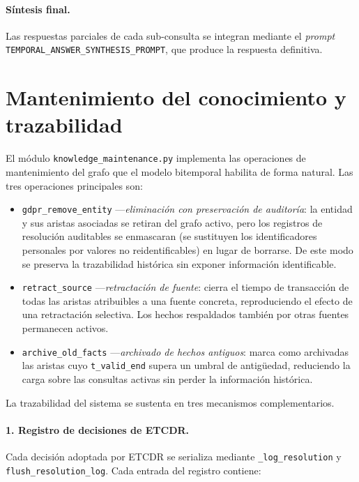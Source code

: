 \paragraph{Síntesis final.}
Las respuestas parciales de cada sub-consulta se integran mediante el \emph{prompt} \texttt{TEMPORAL\_ANSWER\_SYNTHESIS\_PROMPT}, que produce la respuesta definitiva.

\section{Mantenimiento del conocimiento y trazabilidad}\label{sec:impl-maintenance-traceability}

El módulo \texttt{knowledge\_maintenance.py} implementa las operaciones de mantenimiento del grafo que el modelo bitemporal habilita de forma natural. Las tres operaciones principales son:

\begin{itemize}
  \item \texttt{gdpr\_remove\_entity} ---\emph{eliminación con preservación de auditoría}: la entidad y sus aristas asociadas se retiran del grafo activo, pero los registros de resolución auditables se enmascaran (se sustituyen los identificadores personales por valores no reidentificables) en lugar de borrarse. De este modo se preserva la trazabilidad histórica sin exponer información identificable.
  \item \texttt{retract\_source} ---\emph{retractación de fuente}: cierra el tiempo de transacción de todas las aristas atribuibles a una fuente concreta, reproduciendo el efecto de una retractación selectiva. Los hechos respaldados también por otras fuentes permanecen activos.
  \item \texttt{archive\_old\_facts} ---\emph{archivado de hechos antiguos}: marca como archivadas las aristas cuyo \texttt{t\_valid\_end} supera un umbral de antigüedad, reduciendo la carga sobre las consultas activas sin perder la información histórica.
\end{itemize}

La trazabilidad del sistema se sustenta en tres mecanismos complementarios.

\paragraph{1. Registro de decisiones de ETCDR.}
Cada decisión adoptada por ETCDR se serializa mediante \texttt{\_log\_resolution} y \texttt{flush\_resolution\_log}. Cada entrada del registro contiene:

